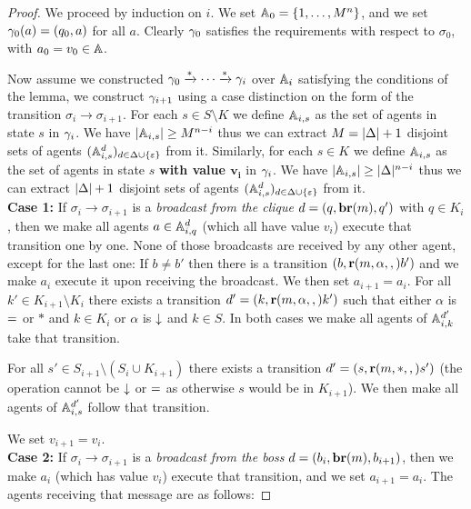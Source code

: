 \ifproofs
\begin{proof}

We proceed by induction on $i$.
We set $\mathbb{A}_0 = \{1, \ldots, M^n\}$, and we set $\gamma_0(a) = (q_0, a)$ for all $a$. Clearly $\gamma_0$ satisfies the requirements with respect to $\sigma_0$, with $a_0 = v_0 \in \mathbb{A}$.

Now assume we constructed $\gamma_0 \xrightarrow{*} \cdots \xrightarrow{*} \gamma_{i}$ over $\mathbb{A}_i$ satisfying the conditions of the lemma, we construct $\gamma_{i+1}$ using a case distinction on the form of the transition $\sigma_i \to \sigma_{i+1}$.
For each $s \in S\setminus K$ we define $\mathbb{A}_{i,s}$ as the set of agents in state $s$ in $\gamma_{i}$. We have $|\mathbb{A}_{i,s}| \geq M^{n-i}$ thus we can extract $M = |\Delta|+1$ disjoint sets of agents $(\mathbb{A}_{i,s}^d)_{d \in \Delta\cup\{\varepsilon\}}$ from it.
Similarly, for each $s \in K$ we define $\mathbb{A}_{i,s}$ as the set of agents in state $s$ \textbf{with value $\mathbf{v_i}$} in $\gamma_{i}$. We have $|\mathbb{A}_{i,s}| \geq |\Delta|^{n-i}$ thus we can extract $|\Delta|+1$ disjoint sets of agents $(\mathbb{A}_{i,s}^d)_{d \in \Delta\cup\{\varepsilon\}}$ from it.
\\

\textbf{Case 1: } If $\sigma_i \to \sigma_{i+1}$ is a \emph{broadcast from the clique} $d = (q, \textbf{br}(m), q')$ with $q \in K_i$, then we make all agents $a \in \mathbb{A}_{i,q}^{d}$ (which all have value $v_i$) execute that transition one by one.
None of those broadcasts are received by any other agent, except for the last one:
If $b \neq b'$ then there is a transition $(b, \textbf{r}(m, \alpha, ,) b')$ and we make $a_i$ execute it upon receiving the broadcast. We then set $a_{i+1} = a_i$.
For all $k' \in K_{i+1} \setminus K_i$ there exists a transition $d'=(k, \textbf{r}(m, \alpha, ,) k')$ such that either $\alpha$ is ${=}$ or $*$ and $k \in K_i$ or $\alpha$ is $\downarrow$ and $k\in S$.
In both cases we make all agents of $\mathbb{A}_{i,k}^{d'}$ take that transition.

For all $s' \in S_{i+1} \setminus (S_i \cup K_{i+1})$ there exists a transition $d'=(s,\textbf{r}(m, *, ,)s')$ (the operation cannot be $\downarrow$ or ${=}$ as otherwise $s$ would be in $K_{i+1}$). We then make all agents of $\mathbb{A}_{i,s}^{d'}$ follow that transition. 

We set $v_{i+1} = v_i$.
\\

\textbf{Case 2: }If $\sigma_i \to \sigma_{i+1}$ is a \emph{broadcast from the boss} $d = (b_i, \textbf{br}(m), b_{i+1})$, then we make $a_i$ (which has value $v_i$) execute that transition, and we set $a_{i+1} = a_i$.
The agents receiving that message are as follows:


\end{proof}
